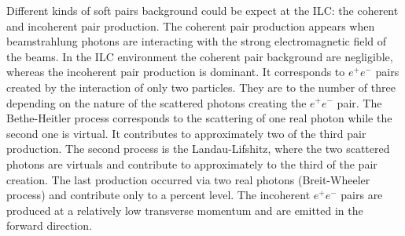     Different kinds of soft pairs background could be expect at the \gls{ILC}: the coherent and incoherent pair production.
    The coherent pair production appears when beamstrahlung photons are interacting with the strong electromagnetic field of the beams.
    In the \gls{ILC} environment the coherent pair background are negligible, whereas the incoherent pair production is dominant.
    It corresponds to $e^+e^-$ pairs created by the interaction of only two particles.
    They are to the number of three depending on the nature of the scattered photons creating the $e^+e^-$ pair.
    The Bethe-Heitler process corresponds to the scattering of one real photon while the second one is virtual.
    It contributes to approximately two of the third pair production.
    The second process is the Landau-Lifshitz, where the two scattered photons are virtuals and contribute to approximately to the third of the pair creation.
    The last production occurred via two real photons (Breit-Wheeler process) and contribute only to a percent level.
    The incoherent $e^+e^-$ pairs are produced at a relatively low transverse momentum and are emitted in the forward direction.
    

